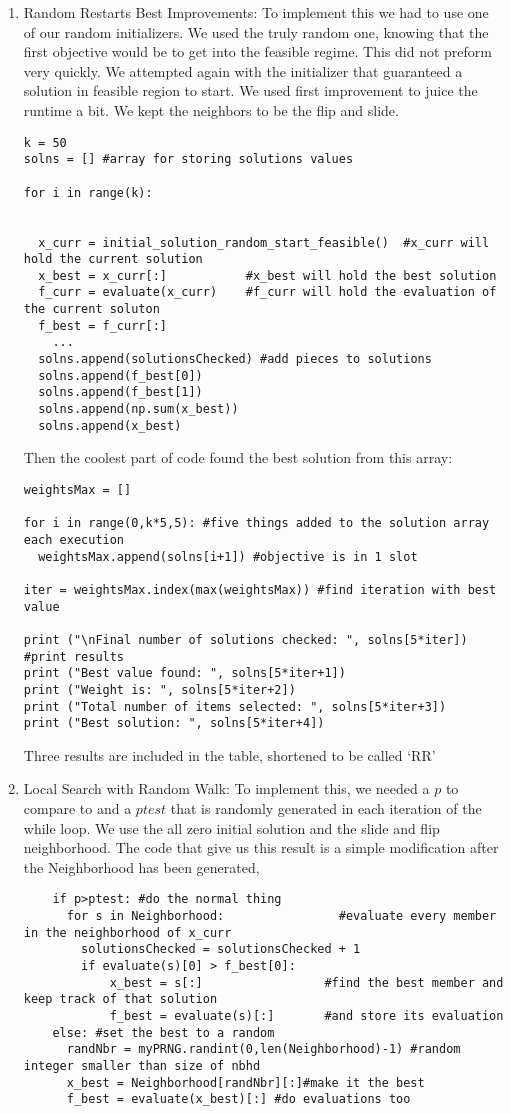 \documentclass[11pt]{article}
\begin{document}
\begin{enumerate}
\item Random Restarts Best Improvements:  To implement this we had to use one of our random initializers. We used the truly random one, knowing that the first objective would be to get into the feasible regime.  This did not preform very quickly.  We attempted again with the initializer that guaranteed a solution in feasible region to start.  We used first improvement to juice the runtime a bit. We kept the neighbors to be the flip and slide. 


\begin{verbatim}
k = 50
solns = [] #array for storing solutions values

for i in range(k):


  x_curr = initial_solution_random_start_feasible()  #x_curr will hold the current solution
  x_best = x_curr[:]           #x_best will hold the best solution
  f_curr = evaluate(x_curr)    #f_curr will hold the evaluation of the current soluton
  f_best = f_curr[:]
	...
  solns.append(solutionsChecked) #add pieces to solutions
  solns.append(f_best[0])
  solns.append(f_best[1])
  solns.append(np.sum(x_best))
  solns.append(x_best)
\end{verbatim}
Then the coolest part of code found the best solution from this array:
\begin{verbatim}
weightsMax = []

for i in range(0,k*5,5): #five things added to the solution array each execution
  weightsMax.append(solns[i+1]) #objective is in 1 slot

iter = weightsMax.index(max(weightsMax)) #find iteration with best value

print ("\nFinal number of solutions checked: ", solns[5*iter]) #print results
print ("Best value found: ", solns[5*iter+1])
print ("Weight is: ", solns[5*iter+2])
print ("Total number of items selected: ", solns[5*iter+3])
print ("Best solution: ", solns[5*iter+4])
\end{verbatim}
Three results are included in the table, shortened to be called `RR'

\item Local Search with Random Walk:  To implement this, we needed a $p$ to compare to and a $ptest$ that is randomly generated in each iteration of the while loop.  We use the all zero initial solution and the slide and flip neighborhood.  The code that give us this result is a simple modification after the Neighborhood has been generated,
\begin{verbatim}
    if p>ptest: #do the normal thing
      for s in Neighborhood:                #evaluate every member in the neighborhood of x_curr
        solutionsChecked = solutionsChecked + 1
        if evaluate(s)[0] > f_best[0]:
            x_best = s[:]                 #find the best member and keep track of that solution
            f_best = evaluate(s)[:]       #and store its evaluation
    else: #set the best to a random
      randNbr = myPRNG.randint(0,len(Neighborhood)-1) #random integer smaller than size of nbhd
      x_best = Neighborhood[randNbr][:]#make it the best 
      f_best = evaluate(x_best)[:] #do evaluations too
\end{verbatim} 



\end{enumerate}
\end{document}
